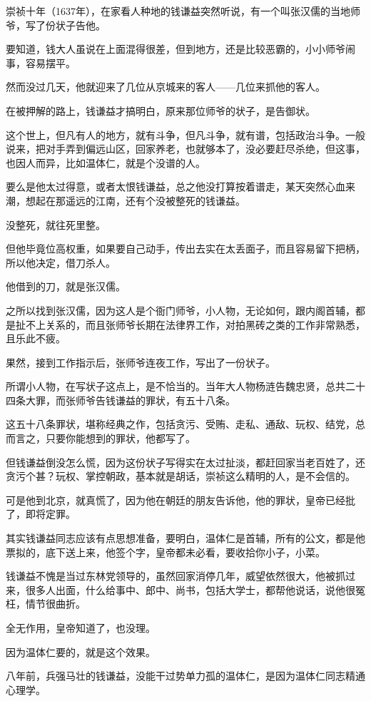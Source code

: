 \begin{multicols}{\theparacolNo}
崇祯十年（1637年），在家看人种地的钱谦益突然听说，有一个叫张汉儒的当地师爷，写了份状子告他。

要知道，钱大人虽说在上面混得很差，但到地方，还是比较恶霸的，小小师爷闹事，容易摆平。

然而没过几天，他就迎来了几位从京城来的客人——几位来抓他的客人。

在被押解的路上，钱谦益才搞明白，原来那位师爷的状子，是告御状。

这个世上，但凡有人的地方，就有斗争，但凡斗争，就有谱，包括政治斗争。一般说来，把对手弄到偏远山区，回家养老，也就够本了，没必要赶尽杀绝，但这事，也因人而异，比如温体仁，就是个没谱的人。

要么是他太过得意，或者太恨钱谦益，总之他没打算按着谱走，某天突然心血来潮，想起在那遥远的江南，还有个没被整死的钱谦益。

没整死，就往死里整。

但他毕竟位高权重，如果要自己动手，传出去实在太丢面子，而且容易留下把柄，所以他决定，借刀杀人。

他借到的刀，就是张汉儒。

之所以找到张汉儒，因为这人是个衙门师爷，小人物，无论如何，跟内阁首辅，都是扯不上关系的，而且张师爷长期在法律界工作，对拍黑砖之类的工作非常熟悉，且乐此不疲。

果然，接到工作指示后，张师爷连夜工作，写出了一份状子。

所谓小人物，在写状子这点上，是不恰当的。当年大人物杨涟告魏忠贤，总共二十四条大罪，而张师爷告钱谦益的罪状，有五十八条。

这五十八条罪状，堪称经典之作，包括贪污、受贿、走私、通敌、玩权、结党，总而言之，只要你能想到的罪状，他都写了。

但钱谦益倒没怎么慌，因为这份状子写得实在太过扯淡，都赶回家当老百姓了，还贪污个甚？玩权、掌控朝政，基本就是胡话，崇祯这么精明的人，是不会信的。

可是他到北京，就真慌了，因为他在朝廷的朋友告诉他，他的罪状，皇帝已经批了，即将定罪。

其实钱谦益同志应该有点思想准备，要明白，温体仁是首辅，所有的公文，都是他票拟的，底下送上来，他签个字，皇帝都未必看，要收拾你小子，小菜。

钱谦益不愧是当过东林党领导的，虽然回家消停几年，威望依然很大，他被抓过来，很多人出面，什么给事中、郎中、尚书，包括大学士，都帮他说话，说他很冤枉，情节很曲折。

全无作用，皇帝知道了，也没理。

因为温体仁要的，就是这个效果。

八年前，兵强马壮的钱谦益，没能干过势单力孤的温体仁，是因为温体仁同志精通心理学。


\end{multicols}

